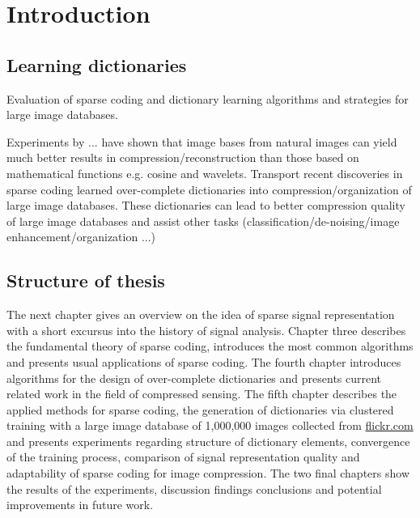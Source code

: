 \chapter{Introduction}
\label{sec:introduction}
\section{Learning dictionaries} %



Evaluation of sparse coding and dictionary learning algorithms and strategies
for large image databases.

Experiments by ... have shown that image bases from natural
images can yield much better results in compression/reconstruction than
those based on mathematical functions e.g. cosine and
wavelets.\cite{Elad2006,Mairal2010}
Transport recent discoveries in sparse coding learned over-complete
dictionaries into compression/organization of large image databases.
These dictionaries can lead to better compression quality of large
image databases and assist other tasks (classification/de-noising/image
enhancement/organization ...)


\section{Structure of thesis}
The next chapter gives an overview on the idea of sparse signal
representation with a short excursus into the history of signal analysis.
Chapter 
three describes the fundamental theory of sparse coding, introduces the most
common algorithms and presents usual applications of sparse coding. The fourth
chapter introduces algorithms for the design of over-complete dictionaries and
presents current related work in the field of compressed sensing. The fifth
chapter describes the applied methods for sparse coding, the generation of
dictionaries via clustered training with a large image database of 1,000,000
images collected from \url{flickr.com} and presents experiments regarding
structure of dictionary elements, convergence of the training process,
comparison of signal representation quality and adaptability of sparse coding
for image compression. The two final chapters show the results of the
experiments, discussion findings conclusions and potential improvements in
future work. 

